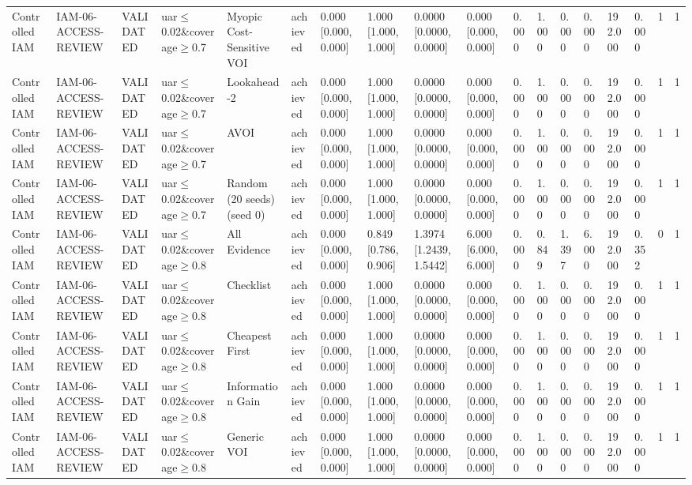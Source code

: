 \begin{table}[!ht]
{\begin{tabular}{llllllllllllllllll}
Controlled IAM & IAM-06-ACCESS-REVIEW & VALIDATED & uar$\le$0.02\&coverage$\ge$0.7 & Myopic Cost-Sensitive VOI & achieved & 0.000 [0.000, 0.000] & 1.000 [1.000, 1.000] & 0.0000 [0.0000, 0.0000] & 0.000 [0.000, 0.000] & 0.000 & 1.000 & 0.000 & 0.000 & 192.000 & 0.000 & 1 & 1 \\
Controlled IAM & IAM-06-ACCESS-REVIEW & VALIDATED & uar$\le$0.02\&coverage$\ge$0.7 & Lookahead-2 & achieved & 0.000 [0.000, 0.000] & 1.000 [1.000, 1.000] & 0.0000 [0.0000, 0.0000] & 0.000 [0.000, 0.000] & 0.000 & 1.000 & 0.000 & 0.000 & 192.000 & 0.000 & 1 & 1 \\
Controlled IAM & IAM-06-ACCESS-REVIEW & VALIDATED & uar$\le$0.02\&coverage$\ge$0.7 & AVOI & achieved & 0.000 [0.000, 0.000] & 1.000 [1.000, 1.000] & 0.0000 [0.0000, 0.0000] & 0.000 [0.000, 0.000] & 0.000 & 1.000 & 0.000 & 0.000 & 192.000 & 0.000 & 1 & 1 \\
Controlled IAM & IAM-06-ACCESS-REVIEW & VALIDATED & uar$\le$0.02\&coverage$\ge$0.7 & Random (20 seeds) (seed 0) & achieved & 0.000 [0.000, 0.000] & 1.000 [1.000, 1.000] & 0.0000 [0.0000, 0.0000] & 0.000 [0.000, 0.000] & 0.000 & 1.000 & 0.000 & 0.000 & 192.000 & 0.000 & 1 & 1 \\
Controlled IAM & IAM-06-ACCESS-REVIEW & VALIDATED & uar$\le$0.02\&coverage$\ge$0.8 & All Evidence & achieved & 0.000 [0.000, 0.000] & 0.849 [0.786, 0.906] & 1.3974 [1.2439, 1.5442] & 6.000 [6.000, 6.000] & 0.000 & 0.849 & 1.397 & 6.000 & 192.000 & 0.352 & 0 & 1 \\
Controlled IAM & IAM-06-ACCESS-REVIEW & VALIDATED & uar$\le$0.02\&coverage$\ge$0.8 & Checklist & achieved & 0.000 [0.000, 0.000] & 1.000 [1.000, 1.000] & 0.0000 [0.0000, 0.0000] & 0.000 [0.000, 0.000] & 0.000 & 1.000 & 0.000 & 0.000 & 192.000 & 0.000 & 1 & 1 \\
Controlled IAM & IAM-06-ACCESS-REVIEW & VALIDATED & uar$\le$0.02\&coverage$\ge$0.8 & Cheapest First & achieved & 0.000 [0.000, 0.000] & 1.000 [1.000, 1.000] & 0.0000 [0.0000, 0.0000] & 0.000 [0.000, 0.000] & 0.000 & 1.000 & 0.000 & 0.000 & 192.000 & 0.000 & 1 & 1 \\
Controlled IAM & IAM-06-ACCESS-REVIEW & VALIDATED & uar$\le$0.02\&coverage$\ge$0.8 & Information Gain & achieved & 0.000 [0.000, 0.000] & 1.000 [1.000, 1.000] & 0.0000 [0.0000, 0.0000] & 0.000 [0.000, 0.000] & 0.000 & 1.000 & 0.000 & 0.000 & 192.000 & 0.000 & 1 & 1 \\
Controlled IAM & IAM-06-ACCESS-REVIEW & VALIDATED & uar$\le$0.02\&coverage$\ge$0.8 & Generic VOI & achieved & 0.000 [0.000, 0.000] & 1.000 [1.000, 1.000] & 0.0000 [0.0000, 0.0000] & 0.000 [0.000, 0.000] & 0.000 & 1.000 & 0.000 & 0.000 & 192.000 & 0.000 & 1 & 1 \\

\end{tabular}}
\end{table}
